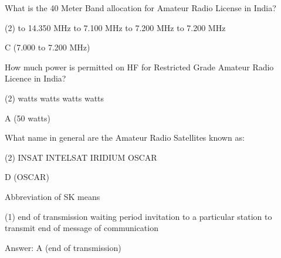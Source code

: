 \documentclass[a4paper]{article}
\begin{document}
\begin{question}What is the 40 Meter Band allocation for Amateur Radio License in India?
	\begin{tasks}(2)
		 to 14.350 MHz
		 to 7.100 MHz
		 to 7.200 MHz
		 to 7.200 MHz
	\end{tasks}
\end{question}

\begin{solution}
	C (7.000 to 7.200 MHz)
\end{solution}

\vspace{5mm}


\begin{question}How much power is permitted on HF for Restricted Grade Amateur Radio Licence in India?
	\begin{tasks}(2)
		 watts
		 watts
		 watts
		 watts
	\end{tasks}
\end{question}

\begin{solution}
	A (50 watts)
\end{solution}

\vspace{5mm}



\begin{question}What name in general are the Amateur Radio Satellites known as:
	\begin{tasks}(2)
		\task INSAT
		\task INTELSAT
		\task IRIDIUM
		\task OSCAR
	\end{tasks}
\end{question}

\begin{solution}
	D (OSCAR)
\end{solution}

\vspace{5mm}


\begin{question}
	Abbreviation of SK means \spaces
	\begin{tasks}(1)
		\task end of transmission
		\task waiting period
		\task invitation to a particular station to transmit
		\task end of message of communication
	\end{tasks}
\end{question}
\begin{solution}
	Answer: A (end of transmission)
\end{solution}
\end{document}
